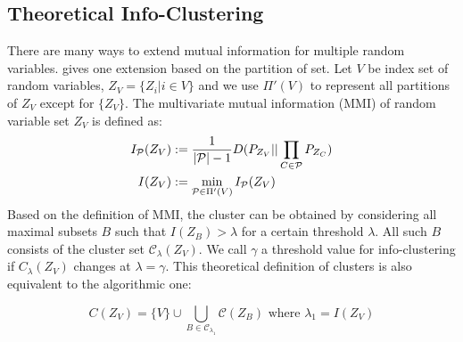 \subsection{Theoretical Info-Clustering}
There are many ways to extend mutual information for multiple random variables. \cite{ic2016} gives one extension based on the partition of set. Let 
$V$ be index set of random variables,
$Z_V=\{Z_i | i \in V\}$ and we use $\Pi'(V)$ to represent all partitions of $Z_V$ except for $\{Z_V\}$. The multivariate mutual information (MMI) of random variable set $Z_V$ is defined as:
\begin{align}
I_{\P}(Z_V) &:= \frac{1}{|\P| - 1}D(P_{Z_V} || \prod_{C\in \P} P_{Z_C}) \\
I(Z_V) &:= \min_{\P \in \Pi'(V)} I_{\P}(Z_V)  \label{eq:IZV}
\end{align}
Based on the definition of MMI, the cluster can be obtained by considering all maximal subsets $B$ such that $I(Z_B) > \lambda$ for a certain threshold $\lambda$. All such $B$ consists of the cluster set $\mathcal{C}_{\lambda}(Z_V)$. We call $\gamma$ a threshold value for info-clustering if $C_{\lambda}(Z_V)$ changes at $\lambda=\gamma$.
This theoretical definition of clusters is also equivalent to the algorithmic one:

\begin{equation}\label{eq:CZV}
C(Z_V) = \{ V\} \cup \bigcup_{B \in \mathcal{C}_{\lambda_1}} \mathcal{C}(Z_B) \textrm{ where } \lambda_1 = I(Z_V)
\end{equation}

